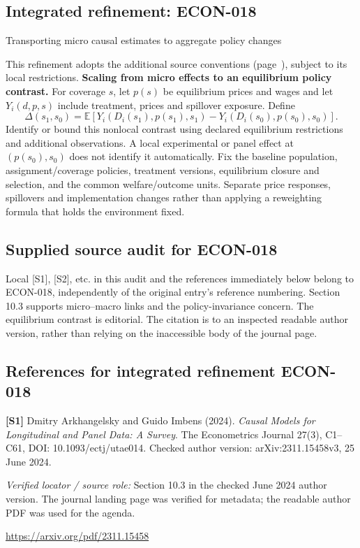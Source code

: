 \documentclass[11pt,a4paper]{article}
\begin{document}
\subsection*{Integrated refinement: ECON-018}
{\sffamily\small\color{muted}Transporting micro causal estimates to aggregate policy changes\par}
This refinement adopts the additional source conventions
(page~\pageref{audited:conventions}), subject to its local restrictions.
\textbf{Scaling from micro effects to an equilibrium policy contrast.}
For coverage $s$, let $p(s)$ be equilibrium prices and wages and let
$Y_i(d,p,s)$ include treatment, prices and spillover exposure. Define
\[
\Delta(s_1,s_0)=\mathbb E[Y_i(D_i(s_1),p(s_1),s_1)
                         -Y_i(D_i(s_0),p(s_0),s_0)].
\]
Identify or bound this nonlocal contrast using declared equilibrium restrictions
and additional observations. A local experimental or panel effect at
$(p(s_0),s_0)$ does not identify it automatically. Fix the baseline population,
assignment/coverage policies, treatment versions, equilibrium closure and
selection, and the common welfare/outcome units. Separate price responses,
spillovers and implementation changes rather than applying a reweighting formula
that holds the environment fixed.
\subsection*{Supplied source audit for ECON-018}
Local [S1], [S2], etc. in this audit and the references immediately below
belong to ECON-018, independently of the original entry's reference numbering.
Section 10.3 supports micro--macro links and the policy-invariance concern. The equilibrium contrast is editorial. The citation is to an inspected readable author version, rather than relying on the inaccessible body of the journal page.
\subsection*{References for integrated refinement ECON-018}
{\footnotesize\raggedright
\par\noindent\textbf{[S1]} Dmitry Arkhangelsky and Guido Imbens (2024). \emph{Causal Models for Longitudinal and Panel Data: A Survey}. The Econometrics Journal 27(3), C1--C61, DOI: 10.1093/ectj/utae014. Checked author version: arXiv:2311.15458v3, 25 June 2024.\par \textit{Verified locator / source role:} Section 10.3 in the checked June 2024 author version. The journal landing page was verified for metadata; the readable author PDF was used for the agenda.\par \url{https://arxiv.org/pdf/2311.15458}\par\smallskip
}
\end{document}
